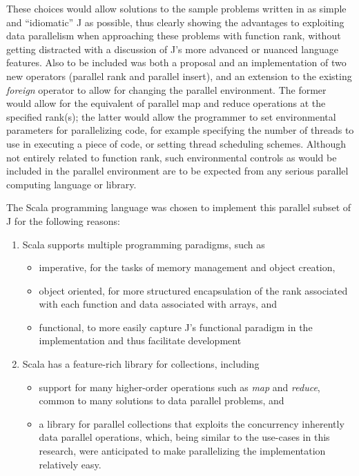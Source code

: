 These choices would allow solutions to the sample problems written in as simple and ``idiomatic'' J as possible, 
thus clearly showing the advantages to exploiting data parallelism when approaching these problems with function rank, 
without getting distracted with a discussion of J's more advanced or nuanced language features. 
Also to be included was both a proposal and an implementation of two new operators (parallel rank and parallel insert), 
and an extension to the existing \textit{foreign} operator to allow for changing the parallel environment. 
The former would allow for the equivalent of parallel map and reduce operations at the specified rank(s); 
the latter would allow the programmer to set environmental parameters for parallelizing code, 
for example specifying the number of threads to use in executing a piece of code, or setting thread scheduling schemes.
Although not entirely related to function rank, such environmental controls as would be included in the parallel environment 
are to be expected from any serious parallel computing language or library.

The Scala programming language was chosen to implement this parallel subset of J for the following reasons\cite{scala}:
\begin{enumerate} 
	\item Scala supports multiple programming paradigms, such as
	\begin{itemize}
		\item imperative, for the tasks of memory management and object creation,
		\item object oriented, for more structured encapsulation of the rank associated with each function 
			and data associated with arrays, and
		\item functional, to more easily capture J's functional paradigm in the implementation and thus facilitate development
	\end{itemize}
	\item Scala has a feature-rich library for collections, including 
	\begin{itemize}
		\item support for many higher-order operations such as \textit{map} and \textit{reduce}, 
			common to many solutions to data parallel problems\cite{scala28col}, and
		\item a library for parallel collections that exploits the concurrency inherently data parallel operations\cite{pc},
			which, being similar to the use-cases in this research, were anticipated to make parallelizing the implementation relatively easy.
	\end{itemize}
\end{enumerate}

